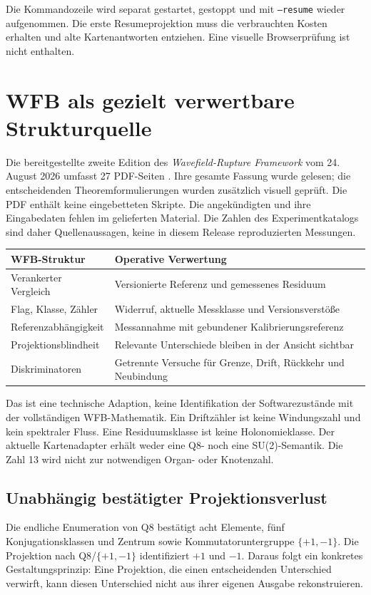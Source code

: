\documentclass[11pt,a4paper]{article}
\newcommand{\nextsection}[2]{\clearpage{\color{accent}\small\textsf{#1}}\section{#2}}
\begin{document}
Die Kommandozeile wird separat gestartet, gestoppt und mit
\texttt{--resume} wieder aufgenommen. Die erste Resumeprojektion
muss die verbrauchten Kosten erhalten und alte Kartenantworten
entziehen. Eine visuelle Browserprüfung ist nicht enthalten.

\nextsection{50 / QUELLENPRÜFUNG}{WFB als gezielt verwertbare Strukturquelle}
Die bereitgestellte zweite Edition des \emph{Wavefield-Rupture
Framework} vom 24. August 2026 umfasst 27 PDF-Seiten \cite{wfb}.
Ihre gesamte Fassung wurde gelesen; die entscheidenden
Theoremformulierungen wurden zusätzlich visuell geprüft.
Die PDF enthält keine eingebetteten Skripte. Die angekündigten
 und ihre Eingabedaten fehlen im gelieferten
Material. Die Zahlen des Experimentkatalogs sind daher
Quellenaussagen, keine in diesem Release reproduzierten Messungen.

\begin{center}\begin{tabularx}{\linewidth}{@{}lY@{}}\toprule
WFB-Struktur & Operative Verwertung\\\midrule
Verankerter Vergleich & Versionierte Referenz und gemessenes Residuum\\
Flag, Klasse, Zähler & Widerruf, aktuelle Messklasse und Versionsverstöße\\
Referenzabhängigkeit & Messannahme mit gebundener Kalibrierungsreferenz\\
Projektionsblindheit & Relevante Unterschiede bleiben in der Ansicht sichtbar\\
Diskriminatoren & Getrennte Versuche für Grenze, Drift, Rückkehr und Neubindung\\\bottomrule
\end{tabularx}\end{center}

Das ist eine technische Adaption, keine Identifikation der
Softwarezustände mit der vollständigen WFB-Mathematik.
Ein Driftzähler ist keine Windungszahl und kein spektraler Fluss.
Eine Residuumsklasse ist keine Holonomieklasse. Der aktuelle
Kartenadapter erhält weder eine Q8- noch eine SU(2)-Semantik.
Die Zahl 13 wird nicht zur notwendigen Organ- oder Knotenzahl.

\subsection{Unabhängig bestätigter Projektionsverlust}
Die endliche Enumeration von Q8 bestätigt acht Elemente, fünf
Konjugationsklassen und Zentrum sowie Kommutatoruntergruppe
$\{+1,-1\}$. Die Projektion nach Q8/$\{+1,-1\}$ identifiziert
$+1$ und $-1$. Daraus folgt ein konkretes Gestaltungsprinzip:
Eine Projektion, die einen entscheidenden Unterschied verwirft,
kann diesen Unterschied nicht aus ihrer eigenen Ausgabe rekonstruieren.
\end{document}
